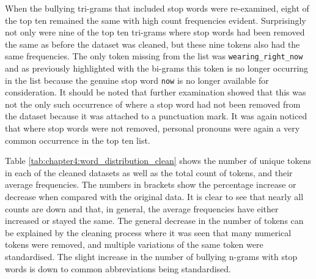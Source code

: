 When the bullying tri-grams that included stop words were re-examined, eight of the top ten remained the same with high count frequencies evident. Surprisingly not only were nine of the top ten tri-grams where stop words had been removed the same as before the dataset was cleaned, but these nine tokens also had the same frequencies. The only token missing from the list was \verb|wearing_right_now| and as previously highlighted with the bi-grams this token is no longer occurring in the list because the genuine stop word \verb|now| is no longer available for consideration. It should be noted that further examination showed that this was not the only such occurrence of where a stop word had not been removed from the dataset because it was attached to a punctuation mark. It was again noticed that where stop words were not removed, personal pronouns were again a very common occurrence in the top ten list.

Table \ref{tab:chapter4:word_distribution_clean} shows the number of unique tokens in each of the cleaned datasets as well as the total count of tokens, and their average frequencies. The numbers in brackets show the percentage increase or decrease when compared with the original data. It is clear to see that nearly all counts are down and that, in general, the average frequencies have either increased or stayed the same. The general decrease in the number of tokens can be explained by the cleaning process where it was seen that many numerical tokens were removed, and multiple variations of the same token were standardised. The slight increase in the number of bullying n-grams with stop words is down to common abbreviations being standardised.

